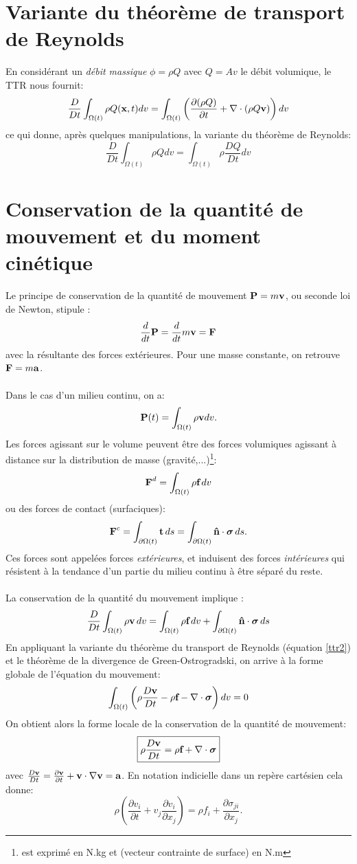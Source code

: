 \section{Variante du théorème de transport de Reynolds}
En considérant un \emph{débit massique} $\phi=\rho Q$ avec $Q=Av$ le débit volumique, le TTR nous fournit:
$$\frac{D}{Dt}\int_{\Omega (t)}\rho Q(\textbf{x},t)dv=\int_{\Omega (t)}\left(\frac{\partial(\rho Q)}{\partial t}+\nabla\cdot(\rho Q\textbf{v})\right)dv$$ ce qui donne, après quelques manipulations, la variante du théorème de Reynolds:
\begin{equation}\label{ttr2}\boxed{\frac{D}{Dt}\int_{\Omega (t)}\rho Qdv=\int_{\Omega(t)}\rho\frac{DQ}{Dt}dv}\end{equation}

\section{Conservation de la quantité de mouvement et du moment cinétique}
Le principe de conservation de la quantité de mouvement $\textbf{P}=m\textbf{v}$, ou seconde loi de Newton, stipule : $$\frac{d}{dt}\textbf{P}=\frac{d}{dt}m\textbf{v}=\textbf{F}$$ avec  la résultante des forces extérieures. Pour une masse constante, on retrouve $\textbf{F}=m\textbf{a}$.
\paragraph{}
Dans le cas d'un milieu continu, on a: $$\textbf{P}(t)=\int_{\Omega(t)}\rho\textbf{v}dv.$$
Les forces agissant sur le volume peuvent être des forces volumiques agissant à distance sur la distribution de masse (gravité,...)\footnote{ est exprimé en N.kg et  (vecteur contrainte de surface) en N.m}: $$\textbf{F}^d=\int_{\Omega (t)}\rho\textbf{f}\,dv$$  ou des forces de contact (surfaciques): $$\textbf{F}^c=\int_{\partial \Omega (t)}\textbf{t}\,ds=\int_{\partial \Omega (t)}\textbf{\^n}\cdot\boldsymbol{\sigma}\,ds.$$ Ces forces sont appelées forces \emph{extérieures}, et induisent des forces \emph{intérieures} qui résistent à la tendance d'un partie du milieu continu à être séparé du reste.
\paragraph{}
La conservation de la quantité du mouvement implique :
$$\frac{D}{Dt}\int_{\Omega (t)}\rho\textbf{v}\,dv=\int_{\Omega (t)}\rho\textbf{f}\,dv+\int_{\partial\Omega (t)}\textbf{\^n}\cdot\boldsymbol{\sigma}\,ds$$
En appliquant la variante du théorème du transport de Reynolds (équation \ref{ttr2}) et le théorème de la divergence de Green-Ostrogradski, on arrive à la forme globale de l'équation du mouvement:
$$\int_{\Omega (t)}\left(\rho\frac{D\textbf{v}}{Dt}-\rho\textbf{f}-\nabla\cdot\boldsymbol{\sigma}\right)dv=0$$
On obtient alors la forme locale de la conservation de la quantité de mouvement:
$$\boxed{\rho\frac{D\textbf{v}}{Dt}=\rho\textbf{f}+\nabla\cdot\boldsymbol{\sigma}}$$
avec $\frac{D\textbf{v}}{Dt}=\frac{\partial \textbf{v}}{\partial t}+\textbf{v}\cdot\nabla\textbf{v}=\textbf{a}$. En notation indicielle dans un repère cartésien cela donne:
$$\rho\left(\frac{\partial v_i}{\partial t}+v_j\frac{\partial v_i}{\partial x_j}\right)=\rho f_i+\frac{\partial \sigma_{ji}}{\partial x_j}.$$
